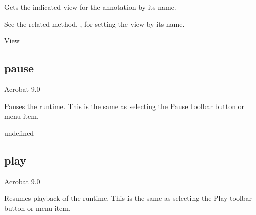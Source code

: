 \documentclass[letterpaper,12pt,english,openany,oneside]{sphinxmanual}
\begin{document}
Gets the indicated view for the annotation by its name.

See the related method, , for setting the view by its name.

\label{\detokenize{JS_3D_API:syntax-89}}

\begin{sphinxVerbatim}[commandchars=\\\{\}]
  
\end{sphinxVerbatim}
\label{\detokenize{JS_3D_API:parameters-66}}

\label{\detokenize{JS_3D_API:section-94}}\label{\detokenize{JS_3D_API:returns-90}}

View


\subsection{pause}
\label{\detokenize{JS_3D_API:pause}}
Acrobat 9.0

Pauses the runtime. This is the same as selecting the Pause toolbar button or menu item.

\label{\detokenize{JS_3D_API:syntax-90}}

\begin{sphinxVerbatim}[commandchars=\\\{\}]
\end{sphinxVerbatim}
\label{\detokenize{JS_3D_API:returns-91}}

undefined


\subsection{play}
\label{\detokenize{JS_3D_API:play-1}}\label{\detokenize{JS_3D_API:id28}}
Acrobat 9.0

Resumes playback of the runtime. This is the same as selecting the Play toolbar button or menu item.

\label{\detokenize{JS_3D_API:syntax-91}}

\begin{sphinxVerbatim}[commandchars=\\\{\}]
\end{sphinxVerbatim}
\label{\detokenize{JS_3D_API:returns-92}}
\end{document}
